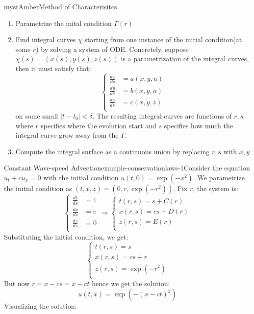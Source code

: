 \begin{mystadmonition}{mystAmber}{Method of Characterisitcs}\begin{enumerate}
\item Parametrize the inital condition $\Gamma(r)$
\item Find integral curves $\chi$ starting from one instance of the initial condition(at some $r$) by solving a system of ODE.
Concretely, suppose $\chi(s) = (x(s),y(s),z(s))$ is a parametrization of the integral curves, then it must satisfy that:
\begin{equation}
\begin{cases}
\frac{dx}{ds}&=a(x,y,u) \\
\frac{dy}{ds}&=b(x,y,u) \\
\frac{dz}{ds}&=c(x,y,z) \\
\end{cases}
\end{equation}
on some small $|t -t_0|<\delta$.  The resulting integral curves are functions of $r,s$ where $r$ specifies where the evolution start and $s$ specifies how much the integral curve grow away from the $\Gamma$.


\item Compute the integral surface as a continuous union by replacing $r,s$ with $x,y$
\end{enumerate}

\end{mystadmonition}
\begin{mystthmexample}{Constant Wave-speed Advection}{example-conservationlaws-1}Consider the equation $u_t+cu_x=0$ with the initial condition $u(t,0)=\exp( -x^2)$. We parametrize the initial condition as $(t,x,z)=(0,r,\exp( -r^2))$. Fix $r$, the system is:
\begin{equation}
\begin{cases}
   \frac{dt}{ds}&=1 \\
   \frac{dx}{ds}&=c \\
   \frac{dz}{ds}&=0 \\
   \end{cases}
   \Longrightarrow
   \begin{cases}
   t(r,s)=s+C(r) \\
   x(r,s)=cs+D(r)\\
   z(r,s)=E(r) \\
   \end{cases}
\end{equation}
Substituting the initial condition, we get:
\begin{equation}
\begin{cases}
   t(r,s)=s \\
   x(r,s)=cs+r\\
   z(r,s)=\exp(-r^2) \\
   \end{cases}
\end{equation}
But now $r=x -cs=x -ct$ hence we get the solution:
\begin{equation}
u(t,x)=\exp(-(x-ct)^2)
\end{equation}
Visualizing the solution:

\end{mystthmexample}
